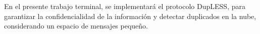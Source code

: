 En el presente trabajo terminal, se implementar\'a el protocolo DupLESS, para garantizar la confidencialidad de la informaci\'on y detectar duplicados en la nube, considerando un 
espacio de mensajes peque\~no. 











